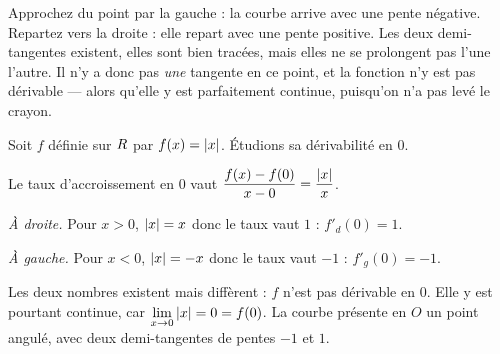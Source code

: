\begin{visualisation}
\begin{center}
\end{center}

Approchez du point par la gauche : la courbe arrive avec une pente négative.
Repartez vers la droite : elle repart avec une pente positive. Les deux
demi-tangentes existent, elles sont bien tracées, mais elles ne se prolongent
pas l'une l'autre. Il n'y a donc pas \emph{une} tangente en ce point, et la
fonction n'y est pas dérivable — alors qu'elle y est parfaitement continue,
puisqu'on n'a pas levé le crayon.
\end{visualisation}

\begin{exemple}
Soit $f$ définie sur $R$ par $f(x) = \left|x\right|$. Étudions sa dérivabilité en
$0$.

Le taux d'accroissement en $0$ vaut
$\dfrac{f(x)-f(0)}{x-0} = \dfrac{\left|x\right|}{x}$.

\smallskip
\emph{À droite.} Pour $x > 0$, $\left|x\right| = x$ donc le taux vaut $1$ :
$f'_{d}(0) = 1$.

\smallskip
\emph{À gauche.} Pour $x < 0$, $\left|x\right| = -x$ donc le taux vaut $-1$ :
$f'_{g}(0) = -1$.

\smallskip
Les deux nombres existent mais diffèrent : $f$ n'est pas dérivable en $0$.
Elle y est pourtant continue, car $\limx{0} \abs{x} = 0 = f(0)$. La courbe
présente en $O$ un point angulé, avec deux demi-tangentes de pentes $-1$
et $1$.
\end{exemple}

